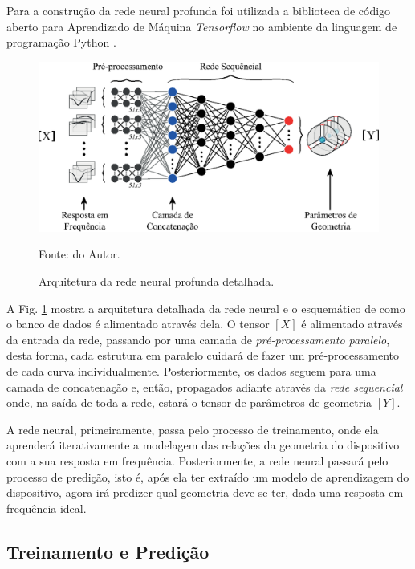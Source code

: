 Para a construção da rede neural profunda foi utilizada a biblioteca de código aberto para Aprendizado de Máquina \textit{Tensorflow} \cite{tensorflow2015whitepaper} no ambiente da linguagem de programação Python \cite{van1995python}.

\begin{figure}[H]
    \centering
    \includegraphics{04-Figuras/StepNetwork-b.eps}
    \caption{Arquitetura da rede neural profunda detalhada.} \par
    Fonte: do Autor.
    \label{fig: StepNetwork-b}
\end{figure}

A Fig. \ref{fig: StepNetwork-b} mostra a arquitetura detalhada da rede neural e o esquemático de como o banco de dados é alimentado através dela. O tensor $[X]$ é alimentado através da entrada da rede, passando por uma camada de \textit{pré-processamento paralelo}, desta forma, cada estrutura em paralelo cuidará de fazer um pré-processamento de cada curva individualmente. Posteriormente, os dados seguem para uma camada de concatenação e, então, propagados adiante através da \textit{rede sequencial} onde, na saída de toda a rede, estará o tensor de parâmetros de geometria $[Y]$.

A rede neural, primeiramente, passa pelo processo de treinamento, onde ela aprenderá iterativamente a modelagem das relações da geometria do dispositivo com a sua resposta em frequência. Posteriormente, a rede neural passará pelo processo de predição, isto é, após ela ter extraído um modelo de aprendizagem do dispositivo, agora irá predizer qual geometria deve-se ter, dada uma resposta em frequência ideal.


\subsection{Treinamento e Predição}


